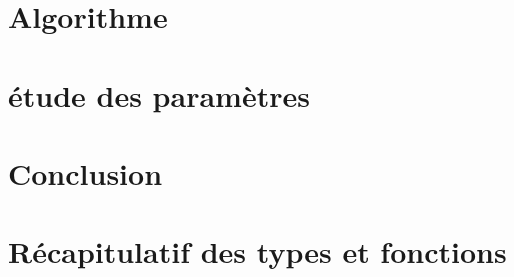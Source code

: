 \documentclass{article}
\begin{document}
\section{Algorithme}
    \subsection{}
\section{étude des paramètres}
    \subsection{}
\section{Conclusion}
    \subsection{}

\appendix
\newpage
\section{Récapitulatif des types et fonctions}
\end{document}
